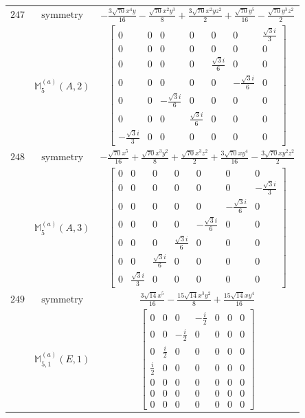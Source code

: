 \documentclass[fleqn,8pt,landscape]{jsarticle}
\begin{document}
\begin{longtable}{ccc}
$ 247 $ & $ \text{symmetry} $ & $ - \frac{3 \sqrt{70} x^{4} y}{16} - \frac{\sqrt{70} x^{2} y^{3}}{8} + \frac{3 \sqrt{70} x^{2} y z^{2}}{2} + \frac{\sqrt{70} y^{5}}{16} - \frac{\sqrt{70} y^{3} z^{2}}{2} $ \\
$  $ & $ \mathbb{M}_{5}^{(a)}(A,2) $ & $ \begin{bmatrix} 0 & 0 & 0 & 0 & 0 & 0 & \frac{\sqrt{3} i}{3} \\ 0 & 0 & 0 & 0 & 0 & 0 & 0 \\ 0 & 0 & 0 & 0 & \frac{\sqrt{3} i}{6} & 0 & 0 \\ 0 & 0 & 0 & 0 & 0 & - \frac{\sqrt{3} i}{6} & 0 \\ 0 & 0 & - \frac{\sqrt{3} i}{6} & 0 & 0 & 0 & 0 \\ 0 & 0 & 0 & \frac{\sqrt{3} i}{6} & 0 & 0 & 0 \\ - \frac{\sqrt{3} i}{3} & 0 & 0 & 0 & 0 & 0 & 0 \end{bmatrix} $ \\ \hline
$ 248 $ & $ \text{symmetry} $ & $ - \frac{\sqrt{70} x^{5}}{16} + \frac{\sqrt{70} x^{3} y^{2}}{8} + \frac{\sqrt{70} x^{3} z^{2}}{2} + \frac{3 \sqrt{70} x y^{4}}{16} - \frac{3 \sqrt{70} x y^{2} z^{2}}{2} $ \\
$  $ & $ \mathbb{M}_{5}^{(a)}(A,3) $ & $ \begin{bmatrix} 0 & 0 & 0 & 0 & 0 & 0 & 0 \\ 0 & 0 & 0 & 0 & 0 & 0 & - \frac{\sqrt{3} i}{3} \\ 0 & 0 & 0 & 0 & 0 & - \frac{\sqrt{3} i}{6} & 0 \\ 0 & 0 & 0 & 0 & - \frac{\sqrt{3} i}{6} & 0 & 0 \\ 0 & 0 & 0 & \frac{\sqrt{3} i}{6} & 0 & 0 & 0 \\ 0 & 0 & \frac{\sqrt{3} i}{6} & 0 & 0 & 0 & 0 \\ 0 & \frac{\sqrt{3} i}{3} & 0 & 0 & 0 & 0 & 0 \end{bmatrix} $ \\ \hline
$ 249 $ & $ \text{symmetry} $ & $ \frac{3 \sqrt{14} x^{5}}{16} - \frac{15 \sqrt{14} x^{3} y^{2}}{8} + \frac{15 \sqrt{14} x y^{4}}{16} $ \\
$  $ & $ \mathbb{M}_{5,1}^{(a)}(E,1) $ & $ \begin{bmatrix} 0 & 0 & 0 & - \frac{i}{2} & 0 & 0 & 0 \\ 0 & 0 & - \frac{i}{2} & 0 & 0 & 0 & 0 \\ 0 & \frac{i}{2} & 0 & 0 & 0 & 0 & 0 \\ \frac{i}{2} & 0 & 0 & 0 & 0 & 0 & 0 \\ 0 & 0 & 0 & 0 & 0 & 0 & 0 \\ 0 & 0 & 0 & 0 & 0 & 0 & 0 \\ 0 & 0 & 0 & 0 & 0 & 0 & 0 \end{bmatrix} $ \\ \hline

\end{longtable}
\end{document}
